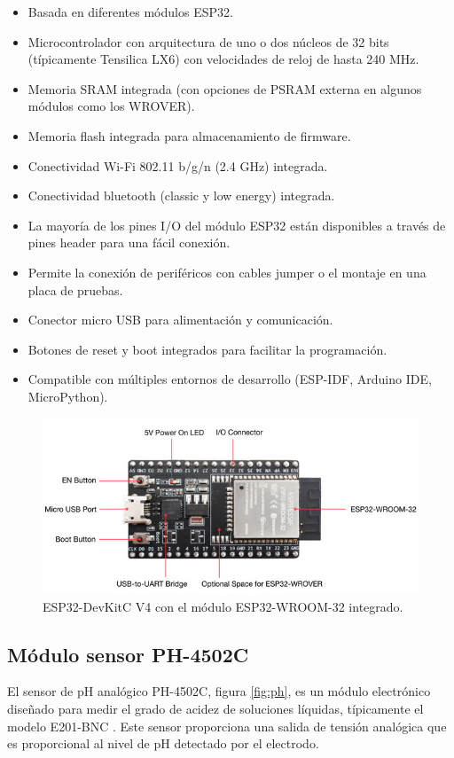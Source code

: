 \begin{itemize}
	\item Basada en diferentes módulos ESP32.
	\item Microcontrolador con arquitectura de uno o dos núcleos de 32 bits (típicamente Tensilica LX6) con velocidades de reloj de hasta 240 MHz.
	\item Memoria SRAM integrada (con opciones de PSRAM externa en algunos módulos como los WROVER).
	\item Memoria flash integrada para almacenamiento de firmware.
	\item Conectividad Wi-Fi 802.11 b/g/n (2.4 GHz) integrada.
	\item Conectividad bluetooth (classic y low energy) integrada.
	\item La mayoría de los pines I/O del módulo ESP32 están disponibles a través de pines header para una fácil conexión.
	\item Permite la conexión de periféricos con cables jumper o el montaje en una placa de pruebas.
	\item Conector micro USB para alimentación y comunicación.
	\item Botones de reset y boot integrados para facilitar la programación.
	\item Compatible con múltiples entornos de desarrollo (ESP-IDF, Arduino IDE, MicroPython).
\end{itemize}

\begin{figure}[h]
\centering
\includegraphics[scale=.5]{./Figures/devkit.png}
	\caption{ESP32-DevKitC V4 con el módulo ESP32-WROOM-32 integrado.}
	\label{fig:devkit}
\end{figure}


\subsection{Módulo sensor PH-4502C}
El sensor de pH analógico PH-4502C, figura \ref{fig:ph}, es un módulo electrónico diseñado para medir el grado de acidez de soluciones líquidas, típicamente el modelo E201-BNC \cite{PH:4502C}. Este sensor proporciona una salida de tensión analógica que es proporcional al nivel de pH detectado por el electrodo.

